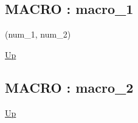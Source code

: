 \subsection*{MACRO : macro\_1}
\hypertarget{ecldoc:example.macro_1}{}
\par
\begin{minipage}[t]{\textwidth}
\begin{flushleft}
  (num\_1, num\_2)
\end{flushleft}
\end{minipage}
\hyperlink{ecldoc:example}{Up} \\
\par
\par
\subsection*{MACRO : macro\_2}
\hypertarget{ecldoc:example.macro_2}{}
\par
\begin{minipage}[t]{\textwidth}
\begin{flushleft}
  
\end{flushleft}
\end{minipage}
\hyperlink{ecldoc:example}{Up} \\
\par
\par

